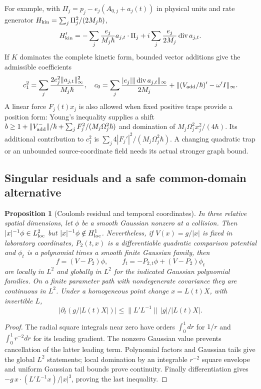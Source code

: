 \documentclass[11pt]{article}
\numberwithin{equation}{section}
\newtheorem{proposition}[theorem]{Proposition}
\theoremstyle{definition}
\theoremstyle{remark}
\begin{document}
For example, with
$\Pi_j=p_j-e_j(A_{0,j}+a_j(t))$ in physical units and rate generator
$H_{\rm kin}=\sum_j\Pi_j^2/(2M_j\hbar)$,
\[
 H_{\rm kin}'=
 -\sum_j\frac{e_j}{M_j\hbar}a_{j,t}\cdot\Pi_j
 +i\sum_j\frac{e_j}{2M_j}\operatorname{div}a_{j,t}.
\]
If $K$ dominates the complete kinetic form, bounded vector additions
give the admissible coefficients
\[
 c_1^2=\sum_j\frac{2e_j^2\|a_{j,t}\|_\infty^2}{M_j\hbar},
 \quad
 c_0=\sum_j\frac{|e_j|\|\operatorname{div}a_{j,t}\|_\infty}{2M_j}
       +\|(V_{\rm add}/\hbar)'-\omega'I\|_\infty .
\]
A linear force $F_j(t)x_j$ is also allowed when fixed positive traps
provide a position form: Young's inequality supplies a shift
$b\geq1+\|V_{\rm add}^-\|/\hbar+
\sum_jF_j^2/(M_j\Omega_j^2\hbar)$ and domination of
$M_j\Omega_j^2x_j^2/(4\hbar)$.
Its additional contribution to $c_1^2$ is
$\sum_j4|F_j'|^2/(M_j\Omega_j^2\hbar)$.
A changing quadratic trap or an unbounded source-coordinate field
needs its actual stronger graph bound.

\subsection{Singular residuals and a safe common-domain alternative}

\begin{proposition}[Coulomb residual and temporal coordinates]
\label{p4s:prop:coulomb}
In three relative spatial dimensions, let $\phi$ be a smooth Gaussian
nonzero at a collision. Then $|x|^{-1}\phi\in L^2_{\rm loc}$ but
$|x|^{-1}\phi\notin H^1_{\rm loc}$. Nevertheless, if $V(x)=g/|x|$
is fixed in laboratory coordinates, $P_2(t,x)$ is a differentiable
quadratic comparison potential and $\phi_t$ is a polynomial times a
smooth finite Gaussian family, then
\[
 f=(V-P_2)\phi,\qquad
 f_t=-P_{2,t}\phi+(V-P_2)\phi_t
\]
are locally in $L^2$ and globally in $L^2$ for the indicated Gaussian
polynomial families. On a finite parameter path with nondegenerate
covariance they are continuous in $L^2$.
Under a homogeneous point change $x=L(t)X$, with invertible $L$,
\[
 |\partial_t(g/|L(t)X|)|
       \leq\|L'L^{-1}\|\,|g|/|L(t)X|.
\]
\end{proposition}
\begin{proof}
The radial square integrals near zero have orders
$\int_0^1dr$ for $1/r$ and $\int_0^1r^{-2}dr$ for its leading
gradient. The nonzero Gaussian value prevents cancellation of the
latter leading term. Polynomial factors and Gaussian tails give the
global $L^2$ statements; local domination by an integrable $r^{-2}$
square envelope and uniform Gaussian tail bounds prove continuity.
Finally differentiation gives
$-g\,x\cdot(L'L^{-1}x)/|x|^3$, proving the last inequality.
\end{proof}
\end{document}
